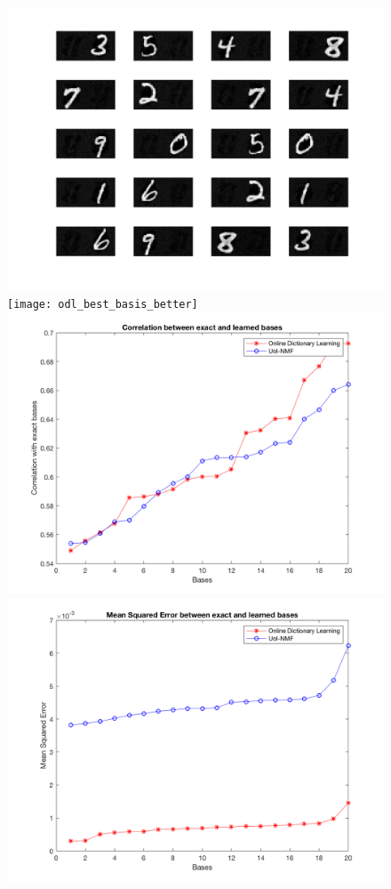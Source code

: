 \documentclass[conference]{IEEEtran}
\begin{document}
\begin{figure}[!htb]
\centering
{}
  \includegraphics[width=\linewidth]{uoi_best_basis}
\endminipage\hfill
{}
  \texttt{[image: odl\_best\_basis\_better]}
\endminipage\hfill
{}%
  \includegraphics[width=\linewidth]{corr_2in1}
\endminipage
{}%
  \includegraphics[width=\linewidth]{mse_2in1}

\end{figure}
\end{document}
